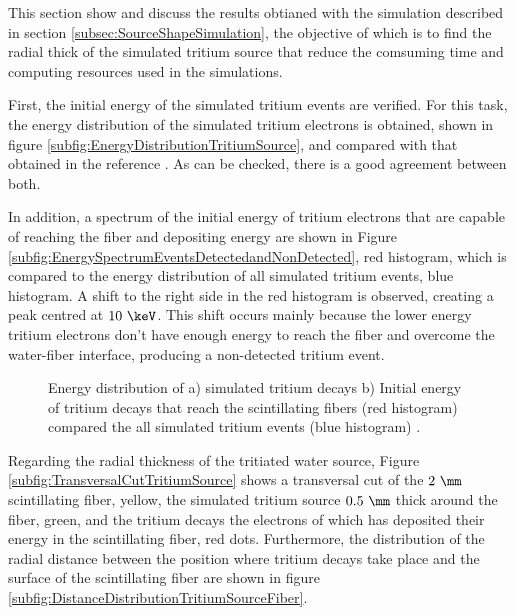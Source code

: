 This section show and discuss the results obtianed with the simulation described in section \ref{subsec:SourceShapeSimulation}, the objective of which is to find the radial thick of the simulated tritium source that reduce the comsuming time and computing resources used in the simulations. 

First, the initial energy of the simulated tritium events are verified. For this task, the energy distribution of the simulated tritium electrons is obtained, shown in figure \ref{subfig:EnergyDistributionTritiumSource}, and compared with that obtained in the reference \cite{TritiumEmissionSpectrum}. As can be checked, there is a good agreement between both.

In addition, a spectrum of the initial energy of tritium electrons that are capable of reaching the fiber and depositing energy are shown in Figure \ref{subfig:EnergySpectrumEventsDetectedandNonDetected}, red histogram, which is compared to the energy distribution of all simulated tritium events, blue histogram. A shift to the right side in the red histogram is observed, creating a peak centred at $10~\keV$. This shift occurs mainly because the lower energy tritium electrons don't have enough energy to reach the fiber and overcome the water-fiber interface, producing a non-detected tritium event.

\begin{figure}[h]
 \centering
 \caption{ Energy distribution of a) simulated tritium decays b) Initial energy of tritium decays that reach the scintillating fibers (red histogram) compared the all simulated tritium events (blue histogram) \cite{SimulationPaperCarlos}.
 \label{fig:TritiumSourceOptimization}}
\end{figure}

Regarding the radial thickness of the tritiated water source, Figure \ref{subfig:TransversalCutTritiumSource} shows a transversal cut of the $2~\mm$ scintillating fiber, yellow, the simulated tritium source $0.5~\mm$ thick around the fiber, green, and the tritium decays the electrons of which has deposited their energy in the scintillating fiber, red dots. Furthermore, the distribution of the radial distance between the position where tritium decays take place and the surface of the scintillating fiber are shown in figure \ref{subfig:DistanceDistributionTritiumSourceFiber}.

